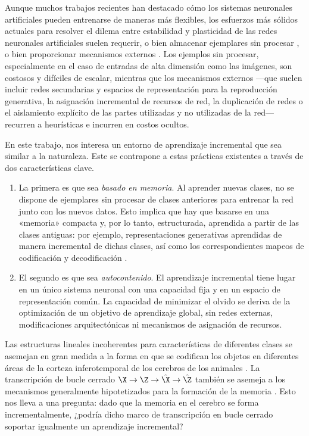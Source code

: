 \documentclass[../../book-main_es.tex]{subfiles}
\begin{document}
Aunque muchos trabajos recientes han destacado cómo los sistemas neuronales artificiales
pueden entrenarse de maneras más flexibles, los esfuerzos más sólidos
actuales para resolver el dilema entre estabilidad y plasticidad de
las redes neuronales artificiales suelen requerir, o bien almacenar ejemplares sin procesar
\cite{icarl,chaudhry2019tiny}, o bien proporcionar mecanismos externos
\cite{EWC}. Los ejemplos sin procesar, especialmente en el caso de
entradas de alta dimensión como las imágenes, son costosos y difíciles de
escalar, mientras que los mecanismos externos ---que suelen incluir redes secundarias
y espacios de representación para la reproducción generativa, la asignación incremental
de recursos de red, la duplicación de redes o el aislamiento explícito
de las partes utilizadas y no utilizadas de la red--- recurren a
heurísticas e incurren en costos ocultos.

En este trabajo, nos interesa un entorno de aprendizaje incremental que sea
similar a la naturaleza. Este se contrapone a estas prácticas existentes a través de dos características clave.
\begin{enumerate}
    \item La primera es que sea \emph{basado en memoria}. Al
        aprender nuevas clases, no se dispone de ejemplares sin procesar de clases anteriores
        para entrenar la red junto con los nuevos datos. Esto implica que hay que basarse 
        en una «memoria» compacta y, por lo tanto, estructurada, aprendida a partir de las clases 
        antiguas: por ejemplo, representaciones generativas aprendidas de manera incremental
        de dichas clases, así como los correspondientes mapeos de 
        codificación y decodificación \cite{fearnet}.
    \item El segundo es que sea \emph{autocontenido}.
        El aprendizaje incremental tiene lugar en un único sistema neuronal
        con una capacidad fija y en un espacio de representación común.
        La capacidad de minimizar el olvido se deriva de la optimización
        de un objetivo de aprendizaje global, sin redes externas,
        modificaciones arquitectónicas ni mecanismos de asignación de recursos.
\end{enumerate}

Las estructuras lineales incoherentes para características de diferentes clases
se asemejan en gran medida a la forma en que se codifican los objetos en diferentes áreas de la
corteza inferotemporal de los cerebros de los animales
\cite{Chang-Cell-2017,Bao2020AMO}. La transcripción de bucle cerrado $\X
\rightarrow \Z \rightarrow \hat{\X} \rightarrow \hat{\Z}$ también
se asemeja a los mecanismos generalmente hipotetizados para la formación de la memoria
\cite{2020Vandeven,Josselyn2020MemoryER}. Esto nos lleva a una pregunta:
dado que la memoria en el cerebro se forma incrementalmente, ¿podría dicho
marco de transcripción en bucle cerrado soportar igualmente un aprendizaje incremental?
\end{document}
